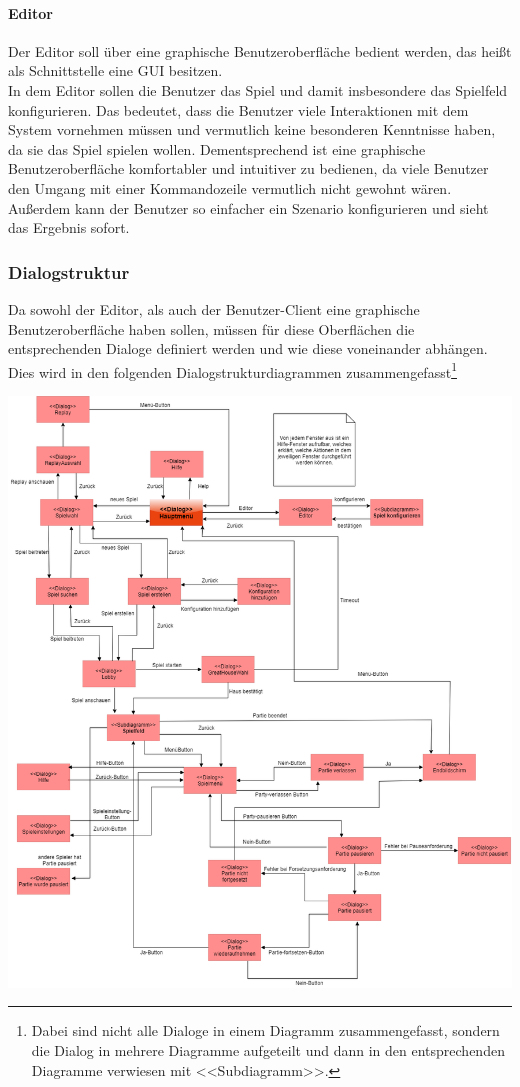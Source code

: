 \documentclass[12pt]{article}
\newcounter{fa}
\newcounter{nfa}
\begin{document}
\paragraph{Editor}
Der Editor soll über eine graphische Benutzeroberfläche bedient werden, das heißt als Schnittstelle 
eine GUI besitzen. \\ In dem Editor sollen die Benutzer das Spiel und damit insbesondere das Spielfeld konfigurieren. Das bedeutet, dass die Benutzer viele Interaktionen mit dem System vornehmen müssen und vermutlich keine besonderen Kenntnisse haben, da sie das Spiel spielen wollen. Dementsprechend ist eine graphische Benutzeroberfläche komfortabler und intuitiver zu bedienen, da viele Benutzer den Umgang mit einer Kommandozeile vermutlich nicht gewohnt wären. Außerdem kann der Benutzer so einfacher ein Szenario konfigurieren und sieht das Ergebnis sofort. 

\subsubsection{Dialogstruktur}
Da sowohl der Editor, als auch der Benutzer-Client eine graphische Benutzeroberfläche haben sollen, müssen für diese Oberflächen die entsprechenden Dialoge definiert werden und wie diese voneinander abhängen. Dies wird in den folgenden Dialogstrukturdiagrammen zusammengefasst\footnote{Dabei sind nicht alle Dialoge in einem Diagramm zusammengefasst, sondern die Dialog in mehrere Diagramme aufgeteilt und dann in den entsprechenden Diagramme verwiesen mit <<Subdiagramm>>.} 

\includegraphics[width=\textwidth]{images/meilen3_a1_Hauptdiagramm}
\end{document}
